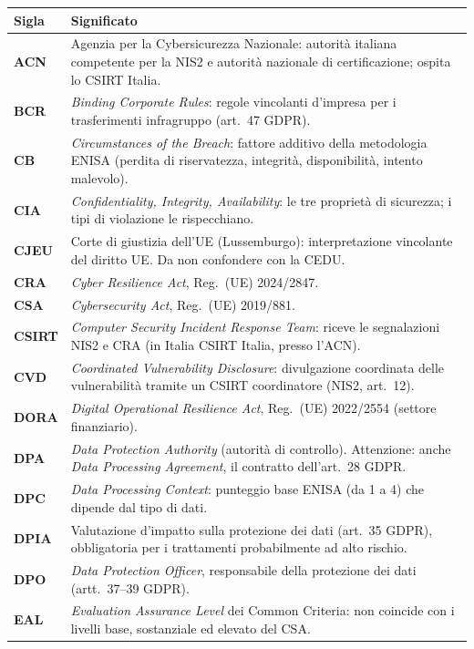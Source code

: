 \begin{longtable}{>{\bfseries}p{}p{}}
\toprule
\normalfont\textbf{Sigla} & \textbf{Significato} \\
\midrule
\endhead
ACN & Agenzia per la Cybersicurezza Nazionale: autorità italiana competente per la NIS2 e autorità
  nazionale di certificazione; ospita lo CSIRT Italia. \\
BCR & \emph{Binding Corporate Rules}: regole vincolanti d'impresa per i trasferimenti infragruppo
  (art.~47 GDPR). \\
CB & \emph{Circumstances of the Breach}: fattore additivo della metodologia ENISA (perdita di
  riservatezza, integrità, disponibilità, intento malevolo). \\
CIA & \emph{Confidentiality, Integrity, Availability}: le tre proprietà di sicurezza; i tipi di
  violazione le rispecchiano. \\
CJEU & Corte di giustizia dell'UE (Lussemburgo): interpretazione vincolante del diritto UE. Da non
  confondere con la CEDU. \\
CRA & \emph{Cyber Resilience Act}, Reg.~(UE) 2024/2847. \\
CSA & \emph{Cybersecurity Act}, Reg.~(UE) 2019/881. \\
CSIRT & \emph{Computer Security Incident Response Team}: riceve le segnalazioni NIS2 e CRA (in Italia
  CSIRT Italia, presso l'ACN). \\
CVD & \emph{Coordinated Vulnerability Disclosure}: divulgazione coordinata delle vulnerabilità tramite un
  CSIRT coordinatore (NIS2, art.~12). \\
DORA & \emph{Digital Operational Resilience Act}, Reg.~(UE) 2022/2554 (settore finanziario). \\
DPA & \emph{Data Protection Authority} (autorità di controllo). Attenzione: anche \emph{Data
  Processing Agreement}, il contratto dell'art.~28 GDPR. \\
DPC & \emph{Data Processing Context}: punteggio base ENISA (da 1 a 4) che dipende dal tipo di dati. \\
DPIA & Valutazione d'impatto sulla protezione dei dati (art.~35 GDPR), obbligatoria per i trattamenti
  probabilmente ad alto rischio. \\
DPO & \emph{Data Protection Officer}, responsabile della protezione dei dati (artt.~37--39 GDPR). \\
EAL & \emph{Evaluation Assurance Level} dei Common Criteria: non coincide con i livelli base,
  sostanziale ed elevato del CSA. \\

\end{longtable}
